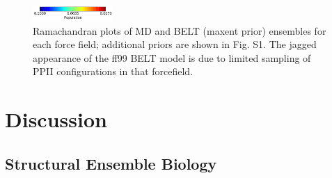 \documentclass[11pt,titlepage]{article}
\begin{document}
\begin{figure}

\includegraphics[width=3.05cm]{figures/ALA3_rama_colorbar.pdf}


\caption{
Ramachandran plots of MD and BELT (maxent prior) ensembles for each force field; additional priors are shown in Fig. S1.  The jagged appearance of the ff99 BELT model is due to limited sampling of PPII configurations in that forcefield.  
}
\label{figure:Rama}
\end{figure}

\section*{Discussion}

\subsection*{Structural Ensemble Biology}
\end{document}
